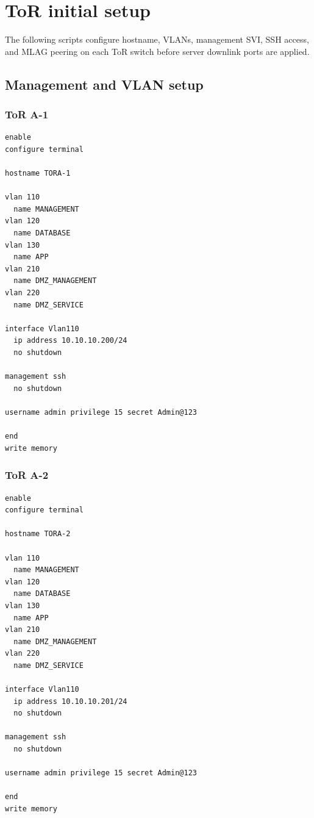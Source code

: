 \section{ToR initial setup}

The following scripts configure hostname, VLANs, management SVI, SSH access, and MLAG peering on each ToR switch before server downlink ports are applied.

\subsection{Management and VLAN setup}

\subsubsection{ToR A-1}
\begin{lstlisting}[caption={ToR A-1: initial management and VLAN setup.},basicstyle=\ttfamily\footnotesize,breaklines=true]
enable
configure terminal

hostname TORA-1

vlan 110
  name MANAGEMENT
vlan 120
  name DATABASE
vlan 130
  name APP
vlan 210
  name DMZ_MANAGEMENT
vlan 220
  name DMZ_SERVICE

interface Vlan110
  ip address 10.10.10.200/24
  no shutdown

management ssh
  no shutdown

username admin privilege 15 secret Admin@123

end
write memory
\end{lstlisting}

\subsubsection{ToR A-2}
\begin{lstlisting}[caption={ToR A-2: initial management and VLAN setup.},basicstyle=\ttfamily\footnotesize,breaklines=true]
enable
configure terminal

hostname TORA-2

vlan 110
  name MANAGEMENT
vlan 120
  name DATABASE
vlan 130
  name APP
vlan 210
  name DMZ_MANAGEMENT
vlan 220
  name DMZ_SERVICE

interface Vlan110
  ip address 10.10.10.201/24
  no shutdown

management ssh
  no shutdown

username admin privilege 15 secret Admin@123

end
write memory
\end{lstlisting}

